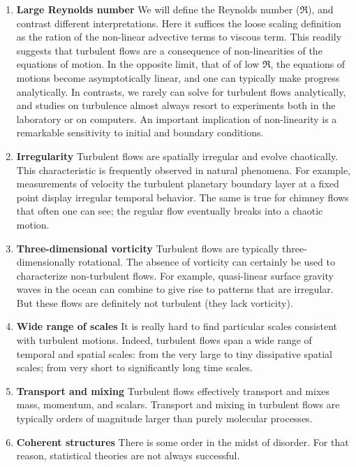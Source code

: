 \documentclass[11pt]{article}
\begin{document}
\begin{enumerate}

    \item {\bf Large Reynolds number}
        \subitem We will define the Reynolds number ($\Re$), and contrast different interpretations. Here it suffices the loose scaling definition as the ration of the non-linear advective terms to viscous term. This readily suggests that turbulent flows are a consequence of non-linearities of the equations of motion. In the opposite limit, that of of low $\Re$, the equations of motions become asymptotically linear, and one can typically make progress analytically. In contrasts, we rarely can solve for turbulent flows analytically, and studies on turbulence almost always resort to experiments both in the laboratory or on computers. An important implication of non-linearity is a remarkable sensitivity to initial and boundary conditions.
    \item {\bf Irregularity}
        \subitem Turbulent flows are spatially irregular and evolve chaotically. This characteristic is frequently observed in natural phenomena. For example, measurements of velocity the turbulent planetary boundary layer at a fixed point display irregular temporal behavior. The same is true for chimney flows that often one can see; the regular flow eventually breaks into a chaotic motion.

    \item {\bf Three-dimensional vorticity}
        \subitem Turbulent flows are typically three-dimensionally rotational. The absence of vorticity can certainly be used to characterize non-turbulent flows. For example, quasi-linear surface gravity waves in the ocean can combine to give rise to patterns that are irregular. But these flows are definitely not turbulent (they lack vorticity).
    
    \item {\bf Wide range of  scales}
        \subitem It is really hard to find particular scales consistent with turbulent motions. Indeed, turbulent flows span a wide range of temporal and spatial scales: from the very large to tiny dissipative spatial scales; from very short to significantly long time scales.

    \item {\bf Transport and mixing}
        \subitem Turbulent flows effectively transport and mixes mass, momentum, and scalars. Transport and mixing in turbulent flows are typically orders of magnitude larger than purely molecular processes.


    \item {\bf Coherent structures}
        \subitem There is some order in the midst of disorder. For that reason, statistical theories are not always successful. 
\end{enumerate}
\end{document}
